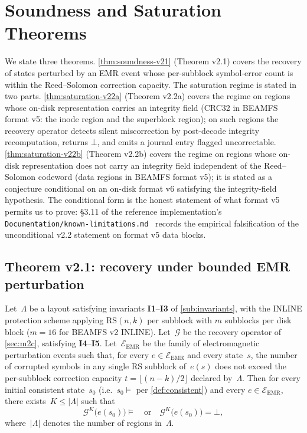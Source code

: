 \section{Soundness and Saturation Theorems}\label{sec:soundness}

\renewcommand{\thedefinition}{v2.\arabic{definition}}
\setcounter{definition}{0}

We state three theorems. \cref{thm:soundness-v21} (Theorem v2.1)
covers the recovery of states perturbed by an EMR event whose
per-subblock symbol-error count is within the Reed--Solomon
correction capacity. The saturation regime is stated in two parts.
\cref{thm:saturation-v22a} (Theorem v2.2a) covers the regime on
regions whose on-disk representation carries an integrity field
(CRC32 in BEAMFS format v5: the inode region and the superblock
region); on such regions the recovery operator detects silent
miscorrection by post-decode integrity recomputation, returns
\(\bot\), and emits a journal entry flagged uncorrectable.
\cref{thm:saturation-v22b} (Theorem v2.2b) covers the regime on
regions whose on-disk representation does not carry an integrity
field independent of the Reed--Solomon codeword (data regions in
BEAMFS format v5); it is stated as a conjecture conditional on an
on-disk format v6 satisfying the integrity-field hypothesis. The
conditional form is the honest statement of what format v5
permits us to prove: \S3.11 of the reference implementation's
\texttt{Documentation/known-limitations.md}~\cite{beamfs-impl}
records the empirical falsification of the unconditional v2.2
statement on format v5 data blocks.

\subsection{Theorem v2.1: recovery under bounded EMR perturbation}

\begin{theorem}\label{thm:soundness-v21}
Let~\(\Lambda\) be a layout satisfying invariants
\textbf{I1}--\textbf{I3} of \cref{sub:invariants}, with the INLINE
protection scheme applying \(\mathrm{RS}(n, k)\) per subblock with
\(m\) subblocks per disk block (\(m = 16\) for BEAMFS v2 INLINE). Let~\(\mathcal{G}\) be the recovery
operator of \cref{sec:m2c}, satisfying \textbf{I4}--\textbf{I5}.
Let~\(\mathcal{E}_{\mathrm{EMR}}\) be the family of electromagnetic
perturbation events such that, for every \(e \in \mathcal{E}_{\mathrm{EMR}}\)
and every state~\(s\), the number of corrupted symbols in any single
RS subblock of~\(e(s)\) does not exceed the per-subblock correction
capacity \(t = \lfloor (n-k)/2 \rfloor\) declared by~\(\Lambda\).
Then for every initial consistent state~\(s_0\) (i.e.\ \(s_0 \models\) per \cref{def:consistent}) and every
\(e \in \mathcal{E}_{\mathrm{EMR}}\), there exists~\(K \le |\Lambda|\)
such that
\[
  \mathcal{G}^{K}\bigl(e(s_0)\bigr) \models
  \quad\text{or}\quad
  \mathcal{G}^{K}\bigl(e(s_0)\bigr) = \bot,
\]
where~\(|\Lambda|\) denotes the number of regions in~\(\Lambda\).
\end{theorem}

